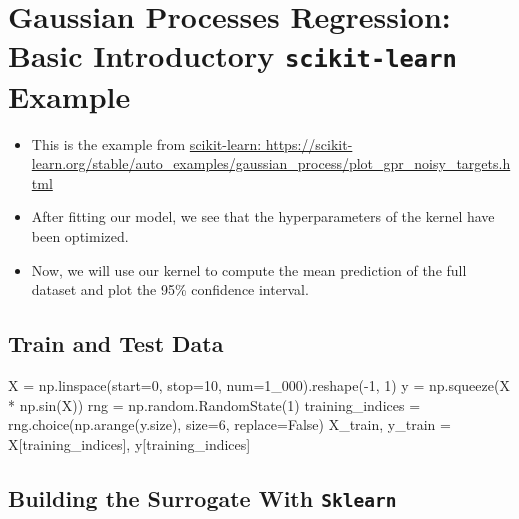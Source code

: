 \documentclass[
  letterpaper,
  DIV=11,
  numbers=noendperiod]{scrreprt}
\newenvironment{Shaded}{\begin{snugshade}}{\end{snugshade}}
\newcommand{\DecValTok}[1]{\textcolor[rgb]{0.68,0.00,0.00}{#1}}
\newcommand{\NormalTok}[1]{\textcolor[rgb]{0.00,0.23,0.31}{#1}}
\newcommand{\OperatorTok}[1]{\textcolor[rgb]{0.37,0.37,0.37}{#1}}
\newcommand{\VariableTok}[1]{\textcolor[rgb]{0.07,0.07,0.07}{#1}}
\begin{document}
\section{\texorpdfstring{Gaussian Processes Regression: Basic
Introductory \texttt{scikit-learn}
Example}{Gaussian Processes Regression: Basic Introductory scikit-learn Example}}\label{gaussian-processes-regression-basic-introductory-scikit-learn-example}

\begin{itemize}
\item
  This is the example from
  \href{https://scikit-learn.org/stable/auto_examples/gaussian_process/plot_gpr_noisy_targets.html}{scikit-learn:
  https://scikit-learn.org/stable/auto\_examples/gaussian\_process/plot\_gpr\_noisy\_targets.html}
\item
  After fitting our model, we see that the hyperparameters of the kernel
  have been optimized.
\item
  Now, we will use our kernel to compute the mean prediction of the full
  dataset and plot the 95\% confidence interval.
\end{itemize}

\subsection{Train and Test Data}\label{train-and-test-data}

\begin{Shaded}
\begin{Highlighting}[]
\NormalTok{X }\OperatorTok{=}\NormalTok{ np.linspace(start}\OperatorTok{=}\DecValTok{0}\NormalTok{, stop}\OperatorTok{=}\DecValTok{10}\NormalTok{, num}\OperatorTok{=}\DecValTok{1\_000}\NormalTok{).reshape(}\OperatorTok{{-}}\DecValTok{1}\NormalTok{, }\DecValTok{1}\NormalTok{)}
\NormalTok{y }\OperatorTok{=}\NormalTok{ np.squeeze(X }\OperatorTok{*}\NormalTok{ np.sin(X))}
\NormalTok{rng }\OperatorTok{=}\NormalTok{ np.random.RandomState(}\DecValTok{1}\NormalTok{)}
\NormalTok{training\_indices }\OperatorTok{=}\NormalTok{ rng.choice(np.arange(y.size), size}\OperatorTok{=}\DecValTok{6}\NormalTok{, replace}\OperatorTok{=}\VariableTok{False}\NormalTok{)}
\NormalTok{X\_train, y\_train }\OperatorTok{=}\NormalTok{ X[training\_indices], y[training\_indices]}
\end{Highlighting}
\end{Shaded}

\subsection{\texorpdfstring{Building the Surrogate With
\texttt{Sklearn}}{Building the Surrogate With Sklearn}}\label{building-the-surrogate-with-sklearn}
\end{document}
